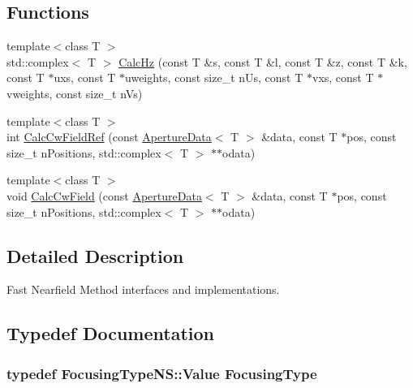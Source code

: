 \subsection*{Functions}
\begin{DoxyCompactItemize}
\item 
{\footnotesize template$<$class T $>$ }\\std\+::complex$<$ T $>$ \hyperlink{namespacefnm_a1486ec1da93598ab2d37b17cf9f62252}{Calc\+Hz} (const T \&s, const T \&l, const T \&z, const T \&k, const T $\ast$uxs, const T $\ast$uweights, const size\+\_\+t n\+Us, const T $\ast$vxs, const T $\ast$vweights, const size\+\_\+t n\+Vs)
\item 
{\footnotesize template$<$class T $>$ }\\int \hyperlink{namespacefnm_a563d8aee788257300131ed9a7af75f64}{Calc\+Cw\+Field\+Ref} (const \hyperlink{singletonfnm_1_1ApertureData}{Aperture\+Data}$<$ T $>$ \&data, const T $\ast$pos, const size\+\_\+t n\+Positions, std\+::complex$<$ T $>$ $\ast$$\ast$odata)
\item 
{\footnotesize template$<$class T $>$ }\\void \hyperlink{namespacefnm_a262768119606bb7e361e68564ba88829}{Calc\+Cw\+Field} (const \hyperlink{singletonfnm_1_1ApertureData}{Aperture\+Data}$<$ T $>$ \&data, const T $\ast$pos, const size\+\_\+t n\+Positions, std\+::complex$<$ T $>$ $\ast$$\ast$odata)
\end{DoxyCompactItemize}


\subsection{Detailed Description}
Fast Nearfield Method interfaces and implementations. 

\subsection{Typedef Documentation}
\hypertarget{namespacefnm_ac5c8ed1b3501db991ccb6065c89c3b54}{
\subsubsection[{Focusing\+Type}]{\setlength{\rightskip}{0pt plus 5cm}typedef {\bf Focusing\+Type\+N\+S\+::\+Value} {\bf Focusing\+Type}}}\label{namespacefnm_ac5c8ed1b3501db991ccb6065c89c3b54}


